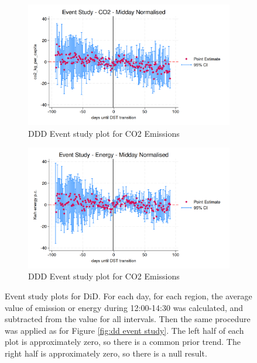 \begin{figure}[ht]
    \centering
    \begin{subfigure}[t]{0.45\textwidth} 
        \includegraphics[width=\textwidth]{EventStudy-MiddayCO2.png}
        \caption{\acs{DDD} Event study plot for CO2 Emissions}
        \label{fig:ddd event study co2}
    \end{subfigure}
    \hfill 
    \begin{subfigure}[t]{0.45\textwidth} 
        \includegraphics[width=\textwidth]{EventStudy-MiddayElec.png} 
        \caption{\acs{DDD} Event study plot for CO2 Emissions} %
        \label{fig:ddd event study elec}
    \end{subfigure}
    \caption[Event study plots for \acs{DiD}]{Event study plots for \acs{DiD}. For each day, for each region, the average value of emission or energy during 12:00-14:30 was calculated, and subtracted from the value for all intervals. Then the same procedure was applied as for Figure \ref{fig:dd event study}. The left half of each plot is approximately zero, so there is a common prior trend. The right half is approximately zero, so there is a null result.} 
    \label{fig:ddd event study}
\end{figure}


